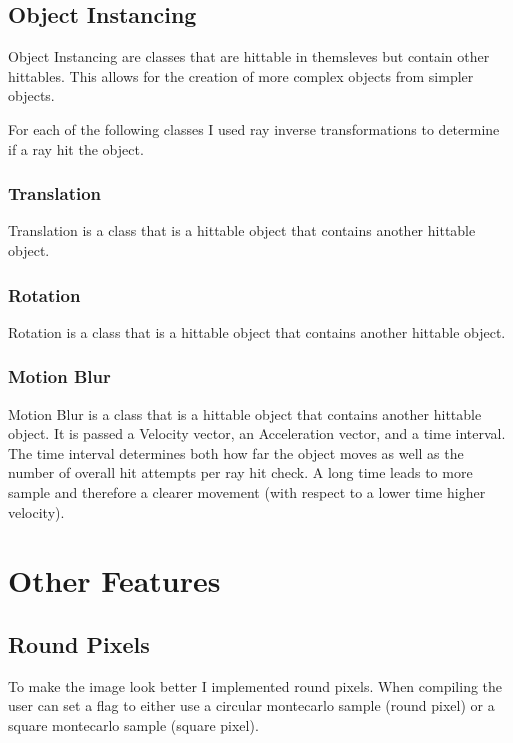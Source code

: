 \documentclass{article}
\begin{document}
    \subsection{Object Instancing}
    Object Instancing are classes that are hittable in themsleves but contain other hittables. This allows for the creation of more complex objects from simpler objects. \par
    For each of the following classes I used ray inverse transformations to determine if a ray hit the object. \par


        \subsubsection{Translation}
        Translation is a class that is a hittable object that contains another hittable object. \par



        \subsubsection{Rotation}
        Rotation is a class that is a hittable object that contains another hittable object. \par



        \subsubsection{Motion Blur}
        Motion Blur is a class that is a hittable object that contains another hittable object. It is passed a Velocity vector, an Acceleration vector, and a time interval. The time interval determines both how far the object moves as well as the number of overall hit attempts per ray hit check. A long time leads to more sample and therefore a clearer movement (with respect to a lower time higher velocity).\par 



\section{Other Features}



    \subsection{Round Pixels}
    To make the image look better I implemented round pixels. When compiling the user can set a flag to either use a circular montecarlo sample (round pixel) or a square montecarlo sample (square pixel). \par
\end{document}
